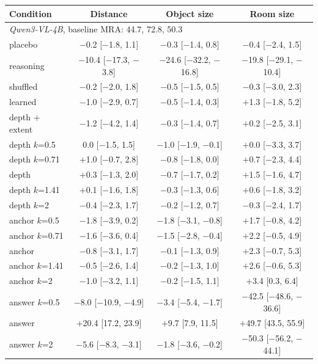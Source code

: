 \documentclass[letterpaper]{article} %
\begin{document}
\begin{table}[t]
\centering
\small
\begin{tabular}{lccc}
\toprule
Condition & Distance & Object size & Room size \\
\midrule
\multicolumn{4}{l}{\emph{Qwen3-VL-4B}, baseline MRA: 44.7, 72.8, 50.3} \\
placebo & $-$0.2 [$-$1.8, 1.1] & $-$0.3 [$-$1.4, 0.8] & $-$0.4 [$-$2.4, 1.5] \\
reasoning & $-$10.4 [$-$17.3, $-$3.8] & $-$24.6 [$-$32.2, $-$16.8] & $-$19.8 [$-$29.1, $-$10.4] \\
shuffled & $-$0.2 [$-$2.0, 1.8] & $-$0.5 [$-$1.5, 0.5] & $-$0.3 [$-$3.0, 2.3] \\
learned & $-$1.0 [$-$2.9, 0.7] & $-$0.5 [$-$1.4, 0.3] & $+$1.3 [$-$1.8, 5.2] \\
depth + extent & $-$1.2 [$-$4.2, 1.4] & $-$0.3 [$-$1.4, 0.7] & $+$0.2 [$-$2.5, 3.1] \\
depth $k$=0.5 & 0.0 [$-$1.5, 1.5] & $-$1.0 [$-$1.9, $-$0.1] & $+$0.0 [$-$3.3, 3.7] \\
depth $k$=0.71 & $+$1.0 [$-$0.7, 2.8] & $-$0.8 [$-$1.8, 0.0] & $+$0.7 [$-$2.3, 4.4] \\
depth & $+$0.3 [$-$1.3, 2.0] & $-$0.7 [$-$1.7, 0.2] & $+$1.5 [$-$1.6, 4.7] \\
depth $k$=1.41 & $+$0.1 [$-$1.6, 1.8] & $-$0.3 [$-$1.3, 0.6] & $+$0.6 [$-$1.8, 3.2] \\
depth $k$=2 & $-$0.4 [$-$2.3, 1.7] & $-$0.2 [$-$1.2, 0.7] & $-$0.3 [$-$2.4, 1.7] \\
anchor $k$=0.5 & $-$1.8 [$-$3.9, 0.2] & $-$1.8 [$-$3.1, $-$0.8] & $+$1.7 [$-$0.8, 4.2] \\
anchor $k$=0.71 & $-$1.6 [$-$3.6, 0.4] & $-$1.5 [$-$2.8, $-$0.4] & $+$2.2 [$-$0.5, 4.9] \\
anchor & $-$0.8 [$-$3.1, 1.7] & $-$0.1 [$-$1.3, 0.9] & $+$2.3 [$-$0.7, 5.3] \\
anchor $k$=1.41 & $-$0.5 [$-$2.6, 1.4] & $-$0.2 [$-$1.3, 1.0] & $+$2.6 [$-$0.6, 5.3] \\
anchor $k$=2 & $-$1.0 [$-$3.2, 1.1] & $-$0.2 [$-$1.5, 1.1] & $+$3.4 [0.3, 6.4] \\
answer $k$=0.5 & $-$8.0 [$-$10.9, $-$4.9] & $-$3.4 [$-$5.4, $-$1.7] & $-$42.5 [$-$48.6, $-$36.6] \\
answer & $+$20.4 [17.2, 23.9] & $+$9.7 [7.9, 11.5] & $+$49.7 [43.5, 55.9] \\
answer $k$=2 & $-$5.6 [$-$8.3, $-$3.1] & $-$1.8 [$-$3.6, $-$0.2] & $-$50.3 [$-$56.2, $-$44.1] \\

\end{tabular}
\end{table}
\end{document}

